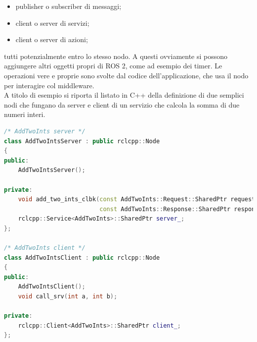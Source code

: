 \begin{itemize}
    \item publisher o subscriber di messaggi;
    \item client o server di servizi;
    \item client o server di azioni;
\end{itemize}
tutti potenzialmente entro lo stesso nodo. A questi ovviamente si possono aggiungere altri oggetti propri di ROS 2, come ad esempio dei timer. Le operazioni vere e proprie sono svolte dal codice dell'applicazione, che usa il nodo per interagire col middleware.\\
A titolo di esempio si riporta il listato in C++ della definizione di due semplici nodi che fungano da server e client di un servizio che calcola la somma di due numeri interi.\newpage

\begin{lstlisting}[language=C++, caption=Definizione delle classi dei nodi server e client del servizio \emph{AddTwoInts}.]
/* AddTwoInts server */
class AddTwoIntsServer : public rclcpp::Node
{
public:
    AddTwoIntsServer();

private:
    void add_two_ints_clbk(const AddTwoInts::Request::SharedPtr request,
                           const AddTwoInts::Response::SharedPtr response);
    rclcpp::Service<AddTwoInts>::SharedPtr server_;
};

/* AddTwoInts client */
class AddTwoIntsClient : public rclcpp::Node
{
public:
    AddTwoIntsClient();
    void call_srv(int a, int b);

private:
    rclcpp::Client<AddTwoInts>::SharedPtr client_;
};
\end{lstlisting}
\newpage

\indent

\indent

\indent

\indent
